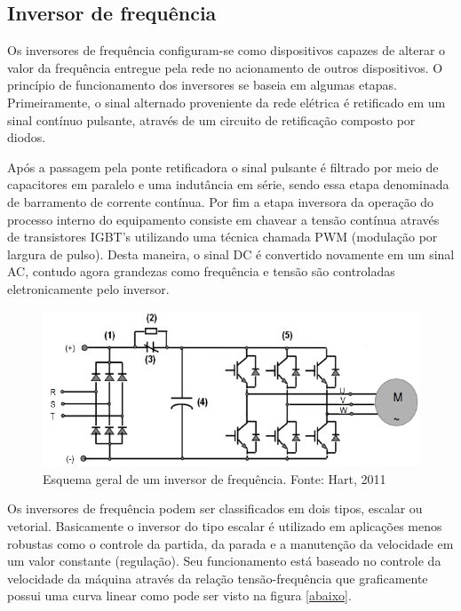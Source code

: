 \documentclass[a4paper, 12pt,oneside, english, brazil]{abntex2}
\begin{document}
\subsection{Inversor de frequência}

Os inversores de frequência configuram-se como dispositivos capazes de alterar o valor da frequência entregue pela rede no acionamento de outros dispositivos. O princípio de funcionamento dos inversores se baseia em algumas etapas. Primeiramente, o sinal alternado proveniente da rede elétrica é retificado em um sinal contínuo pulsante, através de um circuito de retificação composto por diodos.

Após a passagem pela ponte retificadora o sinal pulsante é filtrado por meio de capacitores em paralelo e uma indutância em série, sendo essa etapa denominada de barramento de corrente contínua. 
Por fim a etapa inversora da operação do processo interno do equipamento consiste em chavear a tensão contínua através de transistores IGBT’s utilizando uma técnica chamada PWM (modulação por largura de pulso). Desta maneira, o sinal DC é convertido novamente em um sinal AC, contudo agora grandezas como frequência e tensão são controladas eletronicamente pelo inversor. 

\begin{figure}[H]
    \centering
    \includegraphics[scale=0.8]{inv.png}
    \caption{Esquema geral de um inversor de frequência. Fonte: Hart, 2011}
    \label{inv}
\end{figure}
Os inversores de frequência podem ser classificados em dois tipos, escalar ou vetorial. 
Basicamente o inversor do tipo escalar é utilizado em aplicações menos robustas como o controle da partida, da parada e a manutenção da velocidade em um valor constante (regulação). Seu funcionamento está baseado no controle da velocidade da máquina através da relação tensão-frequência que graficamente possui uma curva linear como pode ser visto na figura \ref{abaixo}.
\end{document}
